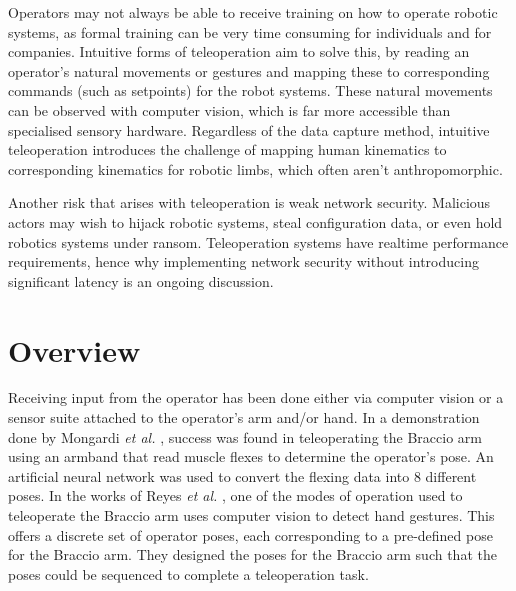 Operators may not always be able to receive training on how to operate robotic systems, as formal training can be very time consuming for individuals and for companies. Intuitive forms of teleoperation aim to solve this, by reading an operator's natural movements or gestures and mapping these to corresponding commands (such as setpoints) for the robot systems. These natural movements can be observed with computer vision, which is far more accessible than specialised sensory hardware. Regardless of the data capture method, intuitive teleoperation introduces the challenge of mapping human kinematics to corresponding kinematics for robotic limbs, which often aren't anthropomorphic.

Another risk that arises with teleoperation is weak network security. Malicious actors may wish to hijack robotic systems, steal configuration data, or even hold robotics systems under ransom. Teleoperation systems have realtime performance requirements, hence why implementing network security without introducing significant latency is an ongoing discussion.

\section{Overview}
Receiving input from the operator has been done either via computer vision or a sensor suite attached to the operator's arm and/or hand. In a demonstration done by Mongardi \textit{et al.} \cite{bib:braccio_armband_demo}, success was found in teleoperating the Braccio arm using an armband that read muscle flexes to determine the operator's pose. An artificial neural network was used to convert the flexing data into 8 different poses. In the works of Reyes \textit{et al.} \cite{bib:braccio_hand_gestures}, one of the modes of operation used to teleoperate the Braccio arm uses computer vision to detect hand gestures. This offers a discrete set of operator poses, each corresponding to a pre-defined pose for the Braccio arm. They designed the poses for the Braccio arm such that the poses could be sequenced to complete a teleoperation task.

